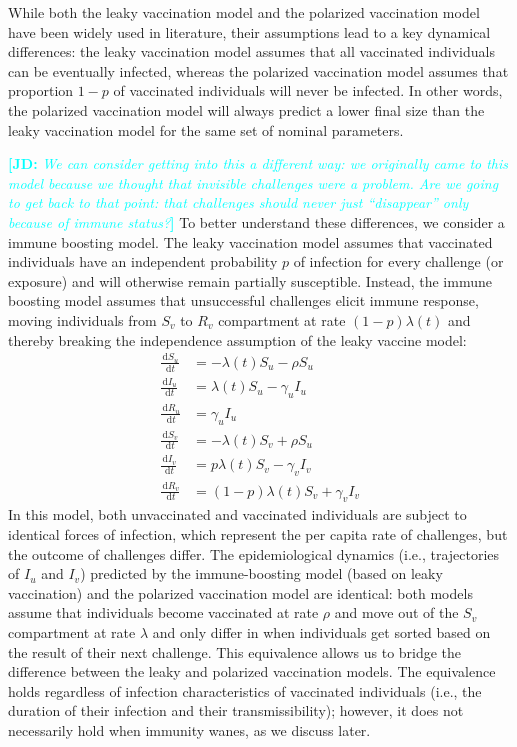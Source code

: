 \documentclass[12pt]{article}
\newcommand{\comment}{\showcomment}
\newcommand{\showcomment}[3]{\textcolor{#1}{\textbf{[#2: }\textsl{#3}\textbf{]}}}
\newcommand{\jd}[1]{\comment{cyan}{JD}{#1}}
\newcommand{\dd}[1]{\ensuremath{\, \mathrm{d}#1}}
\begin{document}
While both the leaky vaccination model and the polarized vaccination model have been widely used in literature, their assumptions lead to a key dynamical differences: the leaky vaccination model assumes that all vaccinated individuals can be eventually infected, whereas the polarized vaccination model assumes that proportion $1-p$ of vaccinated individuals will never be infected.
In other words, the polarized vaccination model will always predict a lower final size than the leaky vaccination model for the same set of nominal parameters.

\jd{We can consider getting into this a different way: we originally came to this model because we thought that invisible challenges were a problem. Are we going to get back to that point: that challenges should never just “disappear” only because of immune status?}
To better understand these differences, we consider a immune boosting model.
The leaky vaccination model assumes that vaccinated individuals have an independent probability $p$ of infection for every challenge (or exposure) and will otherwise remain partially susceptible.
Instead, the immune boosting model assumes that unsuccessful challenges elicit immune response, moving individuals from $S_v$ to $R_v$ compartment at rate $(1-p) \lambda(t)$ and thereby breaking the independence assumption of the leaky vaccine model:  
\begin{align}
\frac{\dd S_u}{\dd t} &= - \lambda(t) S_u - \rho S_u \\
\frac{\dd I_u}{\dd t} &= \lambda(t) S_u - \gamma_u I_u \\
\frac{\dd R_u}{\dd t} &= \gamma_u I_u \\
\frac{\dd S_v}{\dd t} &= - \lambda(t) S_v + \rho S_u \\
\frac{\dd I_v}{\dd t} &= p \lambda(t) S_v - \gamma_v I_v \\
\frac{\dd R_v}{\dd t} &= (1-p) \lambda(t) S_v + \gamma_v I_v
\end{align}
In this model, both unvaccinated and vaccinated individuals are subject to identical forces of infection, which represent the per capita rate of challenges, but the outcome of challenges differ.
The epidemiological dynamics (i.e., trajectories of $I_u$ and $I_v$) predicted by the immune-boosting model (based on leaky vaccination) and the polarized vaccination model are identical: 
both models assume that individuals become vaccinated at rate $\rho$ and move out of the $S_v$ compartment at rate $\lambda$ and only differ in when individuals get sorted based on the result of their next challenge.
This equivalence allows us to bridge the difference between the leaky and polarized vaccination models.
The equivalence holds regardless of infection characteristics of vaccinated individuals (i.e., the duration of their infection and their transmissibility);
however, it does not necessarily hold when immunity wanes, as we discuss later.
\end{document}
